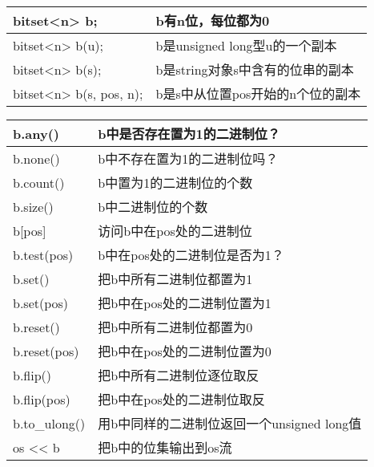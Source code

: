 \begin{table}[h]
\centering
\begin{tabular}{|l|l|}
\hline
bitset<n> b; & b有n位，每位都为0 \\ \hline
bitset<n> b(u); & b是unsigned long型u的一个副本 \\ \hline
bitset<n> b(s); & b是string对象s中含有的位串的副本 \\ \hline
bitset<n> b(s, pos, n); & b是s中从位置pos开始的n个位的副本 \\ \hline
\end{tabular}
\end{table}

\begin{table}[h]
\centering
\begin{tabular}{|l|l|}
\hline
b.any() & b中是否存在置为1的二进制位？ \\ \hline
b.none() & b中不存在置为1的二进制位吗？ \\ \hline
b.count() & b中置为1的二进制位的个数 \\ \hline
b.size() & b中二进制位的个数 \\ \hline
b[pos] & 访问b中在pos处的二进制位 \\ \hline
b.test(pos) & b中在pos处的二进制位是否为1？ \\ \hline
b.set() & 把b中所有二进制位都置为1 \\ \hline
b.set(pos) & 把b中在pos处的二进制位置为1 \\ \hline
b.reset() & 把b中所有二进制位都置为0 \\ \hline
b.reset(pos) & 把b中在pos处的二进制位置为0 \\ \hline
b.flip() & 把b中所有二进制位逐位取反 \\ \hline
b.flip(pos) & 把b中在pos处的二进制位取反 \\ \hline
b.to\_ulong() & 用b中同样的二进制位返回一个unsigned long值 \\ \hline
os << b & 把b中的位集输出到os流 \\ \hline
\end{tabular}
\end{table}
